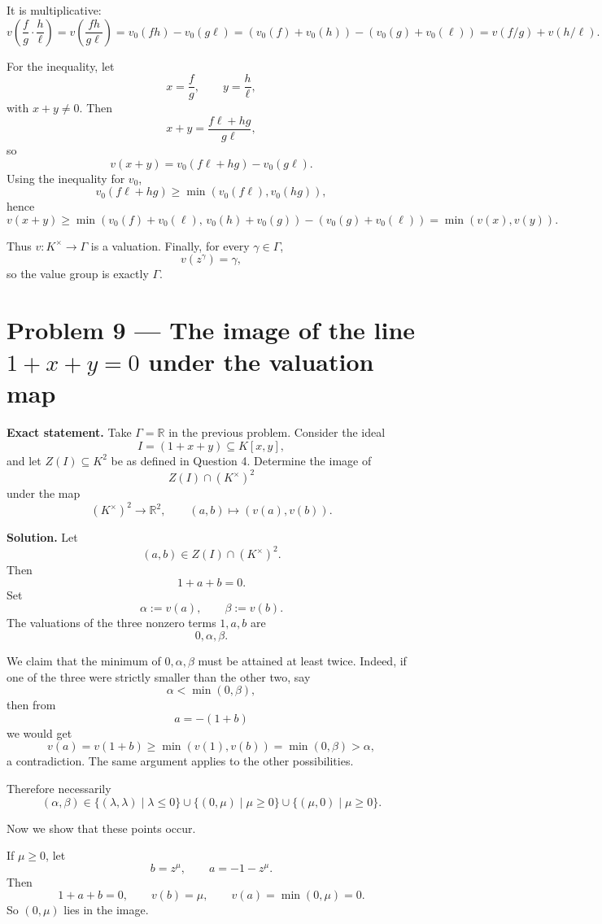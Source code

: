 \documentclass[12pt,a4paper]{article}
\theoremstyle{plain}
\theoremstyle{definition}      %
\begin{document}
It is multiplicative:
\[
v\!\left(\frac{f}{g}\cdot\frac{h}{\ell}\right)
=v\!\left(\frac{fh}{g\ell}\right)
=v_0(fh)-v_0(g\ell)
=(v_0(f)+v_0(h))-(v_0(g)+v_0(\ell))
=v(f/g)+v(h/\ell).
\]

For the inequality, let
\[
x=\frac{f}{g},\qquad y=\frac{h}{\ell},
\]
with \(x+y\neq 0\). Then
\[
x+y=\frac{f\ell+hg}{g\ell},
\]
so
\[
v(x+y)=v_0(f\ell+hg)-v_0(g\ell).
\]
Using the inequality for \(v_0\),
\[
v_0(f\ell+hg)\ge \min(v_0(f\ell),v_0(hg)),
\]
hence
\[
v(x+y)\ge \min(v_0(f)+v_0(\ell),\,v_0(h)+v_0(g))-(v_0(g)+v_0(\ell))
=\min(v(x),v(y)).
\]

Thus \(v:K^\times\to \Gamma\) is a valuation. Finally, for every \(\gamma\in\Gamma\),
\[
v(z^\gamma)=\gamma,
\]
so the value group is exactly \(\Gamma\).

\bigskip

\section*{Problem 9 --- The image of the line \texorpdfstring{$1+x+y=0$}{1+x+y=0} under the valuation map}

\textbf{Exact statement.}
Take \(\Gamma=\mathbb R\) in the previous problem. Consider the ideal
\[
I=(1+x+y)\subseteq K[x,y],
\]
and let \(Z(I)\subseteq K^2\) be as defined in Question 4. Determine the image of
\[
Z(I)\cap (K^\times)^2
\]
under the map
\[
(K^\times)^2\to \mathbb R^2,\qquad (a,b)\mapsto (v(a),v(b)).
\]

\textbf{Solution.}
Let
\[
(a,b)\in Z(I)\cap (K^\times)^2.
\]
Then
\[
1+a+b=0.
\]
Set
\[
\alpha:=v(a),\qquad \beta:=v(b).
\]
The valuations of the three nonzero terms \(1,a,b\) are
\[
0,\alpha,\beta.
\]

We claim that the minimum of \(0,\alpha,\beta\) must be attained at least twice. Indeed, if one of the three were strictly smaller than the other two, say
\[
\alpha<\min(0,\beta),
\]
then from
\[
a=-(1+b)
\]
we would get
\[
v(a)=v(1+b)\ge \min(v(1),v(b))=\min(0,\beta)>\alpha,
\]
a contradiction. The same argument applies to the other possibilities.

Therefore necessarily
\[
(\alpha,\beta)\in
\{(\lambda,\lambda)\mid \lambda\le 0\}
\cup
\{(0,\mu)\mid \mu\ge 0\}
\cup
\{(\mu,0)\mid \mu\ge 0\}.
\]

Now we show that these points occur.

If \(\mu\ge 0\), let
\[
b=z^\mu,\qquad a=-1-z^\mu.
\]
Then
\[
1+a+b=0,
\qquad
v(b)=\mu,
\qquad
v(a)=\min(0,\mu)=0.
\]
So \((0,\mu)\) lies in the image.
\end{document}
